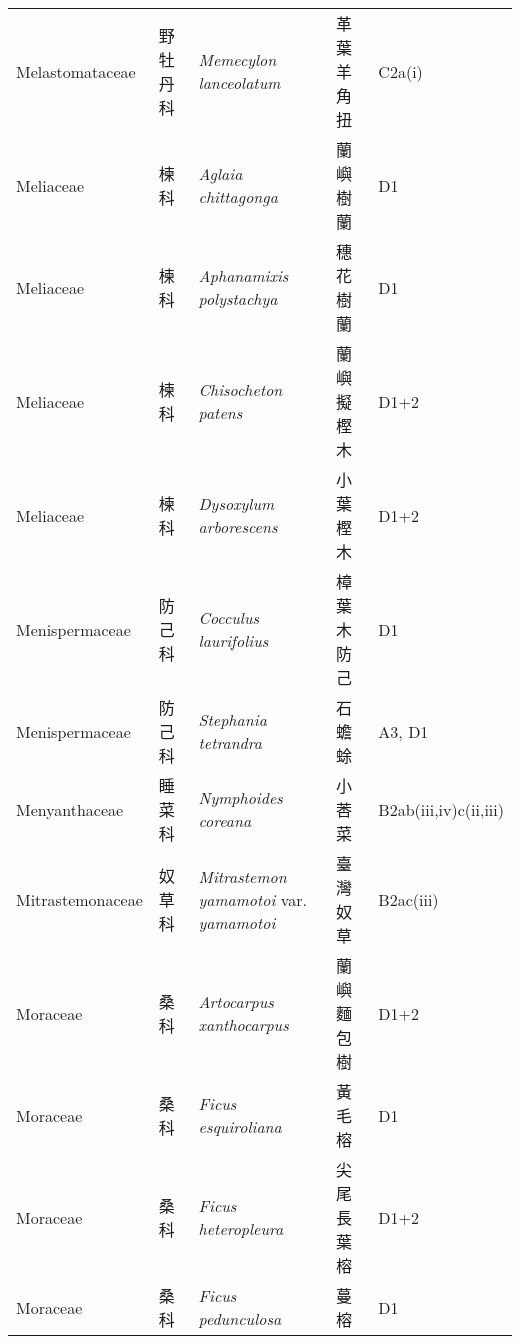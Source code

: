 {\begin{longtable}{p{2.5cm}p{2.5cm}p{4.5cm}p{2.5cm}p{3cm}}
    Melastomataceae & 野牡丹科 & \textit{Memecylon lanceolatum}  & 革葉羊角扭 & C2a(i) \index{Memecylon@\textit{Memecylon}!lanceolatum@\textit{lanceolatum}}  \index{革葉羊角扭} \\
    Meliaceae & 楝科 & \textit{Aglaia chittagonga}  & 蘭嶼樹蘭 & D1 \index{Aglaia@\textit{Aglaia}!chittagonga@\textit{chittagonga}}  \index{蘭嶼樹蘭} \\
    Meliaceae & 楝科 & \textit{Aphanamixis polystachya}  & 穗花樹蘭 & D1 \index{Aphanamixis@\textit{Aphanamixis}!polystachya@\textit{polystachya}}  \index{穗花樹蘭} \\
    Meliaceae & 楝科 & \textit{Chisocheton patens}  & 蘭嶼擬樫木 & D1+2 \index{Chisocheton@\textit{Chisocheton}!patens@\textit{patens}}  \index{蘭嶼擬樫木} \\
    Meliaceae & 楝科 & \textit{Dysoxylum arborescens}  & 小葉樫木 & D1+2 \index{Dysoxylum@\textit{Dysoxylum}!arborescens@\textit{arborescens}}  \index{小葉樫木} \\
    Menispermaceae & 防己科 & \textit{Cocculus laurifolius}  & 樟葉木防己 & D1 \index{Cocculus@\textit{Cocculus}!laurifolius@\textit{laurifolius}}  \index{樟葉木防己} \\
    Menispermaceae & 防己科 & \textit{Stephania tetrandra}  & 石蟾蜍 & A3, D1 \index{Stephania@\textit{Stephania}!tetrandra@\textit{tetrandra}}  \index{石蟾蜍} \\
    Menyanthaceae & 睡菜科 & \textit{Nymphoides coreana}  & 小莕菜 & B2ab(iii,iv)c(ii,iii) \index{Nymphoides@\textit{Nymphoides}!coreana@\textit{coreana}}  \index{小莕菜} \\
    Mitrastemonaceae & 奴草科 & \textit{Mitrastemon yamamotoi} var. \textit{yamamotoi}  & 臺灣奴草 & B2ac(iii) \index{Mitrastemon@\textit{Mitrastemon}!yamamotoi@\textit{yamamotoi}!var. yamamotoi@var. \textit{yamamotoi}}  \index{臺灣奴草} \\
    Moraceae & 桑科 & \textit{Artocarpus xanthocarpus}  & 蘭嶼麵包樹 & D1+2 \index{Artocarpus@\textit{Artocarpus}!xanthocarpus@\textit{xanthocarpus}}  \index{蘭嶼麵包樹} \\
    Moraceae & 桑科 & \textit{Ficus esquiroliana}  & 黃毛榕 & D1 \index{Ficus@\textit{Ficus}!esquiroliana@\textit{esquiroliana}}  \index{黃毛榕} \\
    Moraceae & 桑科 & \textit{Ficus heteropleura}  & 尖尾長葉榕 & D1+2 \index{Ficus@\textit{Ficus}!heteropleura@\textit{heteropleura}}  \index{尖尾長葉榕} \\
    Moraceae & 桑科 & \textit{Ficus pedunculosa}  & 蔓榕 & D1 \index{Ficus@\textit{Ficus}!pedunculosa@\textit{pedunculosa}}  \index{蔓榕} \\

\end{longtable}}
